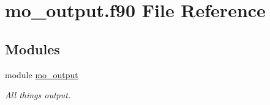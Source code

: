 \hypertarget{mo__output_8f90}{
\section{mo\_\-output.f90 File Reference}
\label{mo__output_8f90}
}
\subsection*{Modules}
\begin{DoxyCompactItemize}
\item 
module \hyperlink{namespacemo__output}{mo\_\-output}


\begin{DoxyCompactList}\small\item\em All things output. \item\end{DoxyCompactList}

\end{DoxyCompactItemize}
